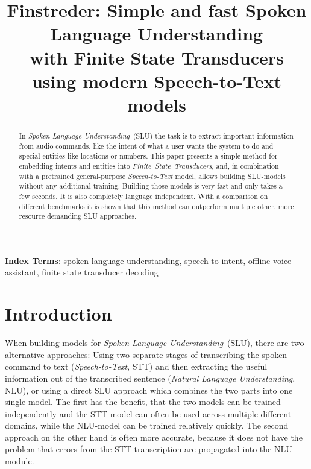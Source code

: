 \documentclass[a4paper]{article}
\title{Finstreder: Simple and fast Spoken Language Understanding \\ with Finite State Transducers using modern Speech-to-Text models}
\begin{document}
\maketitle
  
\begin{abstract}
	In \textit{Spoken Language Understanding}~(SLU) the task is to extract important information from audio commands, like the intent of what a user wants the system to do and special entities like locations or numbers.
	This paper presents a simple method for embedding intents and entities into \mbox{\textit{Finite State Transducers}}, and, in combination with a pretrained general-purpose \textit{Speech-to-Text} model, allows building \mbox{SLU-models} without any additional training. Building those models is very fast and only takes a few seconds. It is also completely language independent.
	With a comparison on different benchmarks it is shown that this method can outperform multiple other, more resource demanding SLU approaches.
\end{abstract}

\noindent\textbf{Index Terms}: spoken language understanding, speech to intent, offline voice assistant, finite state transducer decoding



\section{Introduction}
\label{sec:intro}

When building models for \textit{Spoken Language Understanding}~(SLU), there are two alternative approaches: Using two separate stages of transcribing the spoken command to text (\textit{Speech-to-Text}, STT) and then extracting the useful information out of the transcribed sentence (\textit{Natural Language Understanding}, NLU), or using a direct SLU approach which combines the two parts into one single model. The first has the benefit, that the two models can be trained independently and the STT-model can often be used across multiple different domains, while the NLU-model can be trained relatively quickly. The second approach on the other hand is often more accurate, because it does not have the problem that errors from the STT transcription are propagated into the NLU module.
\end{document}
